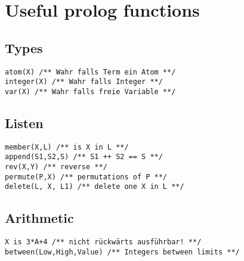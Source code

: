 \section{Useful prolog functions}
\subsection{Types}
\begin{verbatim}
atom(X) /** Wahr falls Term ein Atom **/
integer(X) /** Wahr falls Integer **/
var(X) /** Wahr falls freie Variable **/
\end{verbatim}
\subsection{Listen}
\begin{verbatim}
member(X,L) /** is X in L **/
append(S1,S2,S) /** S1 ++ S2 == S **/
rev(X,Y) /** reverse **/
permute(P,X) /** permutations of P **/
delete(L, X, L1) /** delete one X in L **/
\end{verbatim}
\subsection{Arithmetic}
\begin{verbatim}
X is 3*A+4 /** nicht rückwärts ausführbar! **/
between(Low,High,Value) /** Integers between limits **/  
\end{verbatim}